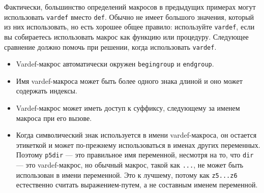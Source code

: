 \documentclass{article} %
\begin{document}
Фактически, большинство определений макросов в предыдущих примерах могут 
использовать {\tt vardef} вместо {\tt def}. 
Обычно не имеет большого значения, который из них использовать, но есть 
хорошее общее правило: используйте {\tt vardef}, если вы собираетесь 
использовать макрос как функцию или процедуру.
Следующее сравнение должно помочь при решении, когда использовать 
{\tt vardef}. 

\begin{itemize}
\item Vardef-макрос автоматически окружен {\tt begingroup} и 
{\tt endgroup}.
\item Имя vardef-макроса может быть более одного знака длиной и оно 
может содержать индексы.
\item Vardef-макрос может иметь доступ к суффиксу, следующему за именем 
макроса при его вызове.
\item Когда символический знак используется в имени vardef-макроса, он 
остается этикеткой и может по-прежнему использоваться в именах 
других переменных. 
Поэтому {\tt p5dir} --- это правильное имя переменной, несмотря на то, что 
{\tt dir} --- это vardef-макрос, но обычный макрос, такой как {\tt ...}, не может быть использован в имени переменной. 
Это к лучшему, потому как {\tt z5...z6} естественно считать выражением-путем, 
а не составным именем переменной.
\end{itemize}
\end{document}
